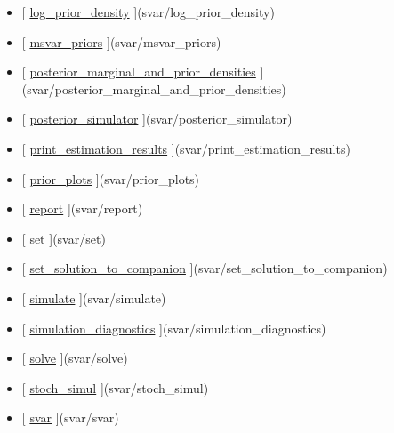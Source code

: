 \documentclass[letterpaper,10pt,english]{sphinxmanual}
\begin{document}
\begin{itemize}
\item {} 
{[} {\hyperref[classes/models/@svar/svar:log-prior-density]{log\_prior\_density}} {]}(svar/log\_prior\_density)

\item {} 
{[} {\hyperref[classes/models/@svar/svar:msvar-priors]{msvar\_priors}} {]}(svar/msvar\_priors)

\item {} 
{[} {\hyperref[classes/models/@svar/svar:posterior-marginal-and-prior-densities]{posterior\_marginal\_and\_prior\_densities}} {]}(svar/posterior\_marginal\_and\_prior\_densities)

\item {} 
{[} {\hyperref[classes/models/@svar/svar:posterior-simulator]{posterior\_simulator}} {]}(svar/posterior\_simulator)

\item {} 
{[} {\hyperref[classes/models/@svar/svar:print-estimation-results]{print\_estimation\_results}} {]}(svar/print\_estimation\_results)

\item {} 
{[} {\hyperref[classes/models/@svar/svar:prior-plots]{prior\_plots}} {]}(svar/prior\_plots)

\item {} 
{[} {\hyperref[classes/models/@svar/svar:report]{report}} {]}(svar/report)

\item {} 
{[} {\hyperref[classes/models/@svar/svar:set]{set}} {]}(svar/set)

\item {} 
{[} {\hyperref[classes/models/@svar/svar:set-solution-to-companion]{set\_solution\_to\_companion}} {]}(svar/set\_solution\_to\_companion)

\item {} 
{[} {\hyperref[classes/models/@svar/svar:simulate]{simulate}} {]}(svar/simulate)

\item {} 
{[} {\hyperref[classes/models/@svar/svar:simulation-diagnostics]{simulation\_diagnostics}} {]}(svar/simulation\_diagnostics)

\item {} 
{[} {\hyperref[classes/models/@svar/svar:solve]{solve}} {]}(svar/solve)

\item {} 
{[} {\hyperref[classes/models/@svar/svar:stoch-simul]{stoch\_simul}} {]}(svar/stoch\_simul)

\item {} 
{[} {\hyperref[classes/models/@svar/svar:svar]{svar}} {]}(svar/svar)


\end{itemize}
\end{document}
